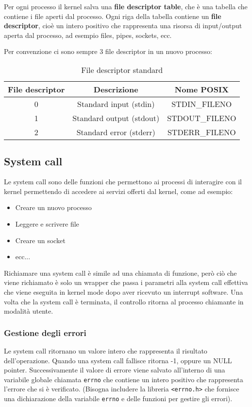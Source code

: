 \documentclass[a4paper]{article}
\begin{document}
\vspace{1em}
\noindent
Per ogni processo il kernel salva una \textbf{file descriptor table}, che è una tabella
che contiene i file aperti dal processo. Ogni riga della tabella contiene un
\textbf{file descriptor}, cioè un intero positivo che rappresenta una risorsa di 
input/output aperta dal processo, ad esempio files, pipes, sockets, ecc.

Per convenzione ci sono sempre 3 file descriptor in un nuovo processo:
\begin{table}[H]
  \centering
  \begin{tabular}{c|c|c}
    \textbf{File descriptor} & \textbf{Descrizione} & \textbf{Nome POSIX} \\
    \hline
    0 & Standard input (stdin) & STDIN\_FILENO \\
    1 & Standard output (stdout) & STDOUT\_FILENO \\
    2 & Standard error (stderr) & STDERR\_FILENO \\
  \end{tabular}
  \caption{File descriptor standard}
\end{table}

\subsection{System call}
Le system call sono delle funzioni che permettono ai processi di interagire con il
kernel permettendo di accedere ai servizi offerti dal kernel, come ad esempio:
\begin{itemize}
  \item Creare un nuovo processo
  \item Leggere e scrivere file
  \item Creare un socket
  \item ecc...
\end{itemize}
Richiamare una system call è simile ad una chiamata di funzione, però ciò che viene
richiamato è solo un wrapper che passa i parametri alla system call effettiva che
viene eseguita in kernel mode dopo aver ricevuto un interrupt software. Una volta
che la system call è terminata, il controllo ritorna al processo chiamante in modalità
utente.

\subsubsection{Gestione degli errori}
Le system call ritornano un valore intero che rappresenta il risultato dell'operazione.
Quando una system call fallisce ritorna -1, oppure un NULL pointer. Successivamente
il valore di errore viene salvato all'interno di
una variabile globale chiamata \texttt{errno} che contiene un intero positivo che
rappresenta l'errore che si è verificato.
(Bisogna includere la libreria \texttt{<errno.h>} che fornisce una dichiarazione
della variabile \texttt{errno} e delle funzioni per gestire gli errori).
\end{document}
